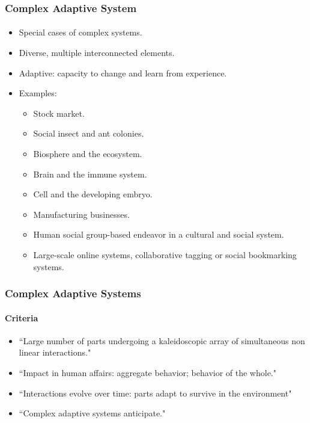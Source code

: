 \frame
{
	\frametitle{Complex Adaptive System}
	\framesubtitle{}

	\begin{itemize}
		\item Special cases of complex systems.
		\item Diverse, multiple interconnected elements.
		\item Adaptive: capacity to change and learn from experience.
		\item Examples:
		\begin{itemize}
			\item Stock market.
			\item Social insect and ant colonies.
			\item Biosphere and the ecosystem.
			\item Brain and the immune system.
			\item Cell and the developing embryo.
			\item Manufacturing businesses.
			\item Human social group-based endeavor in a cultural and social system.
			\item Large-scale online systems, collaborative tagging or social bookmarking systems.
		\end{itemize}
	\end{itemize}
}

\frame
{
	\frametitle{Complex Adaptive Systems}
	\framesubtitle{Criteria}

	\begin{itemize}
		\item ``Large number of parts undergoing a kaleidoscopic array of simultaneous non linear interactions."
		\item ``Impact in human affairs: aggregate behavior; behavior of the whole."
		\item ``Interactions evolve over time: parts adapt to survive in the environment"
		\item ``Complex adaptive systems anticipate."
	\end{itemize}
}

